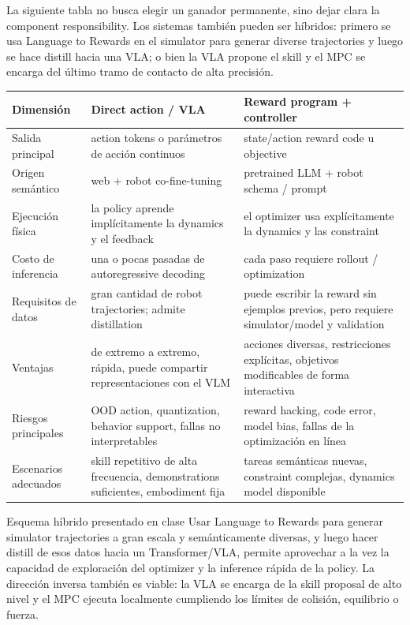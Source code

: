 \documentclass[a4paper]{article}
\begin{document}
La siguiente tabla no busca elegir un ganador permanente, sino dejar clara la component responsibility. Los sistemas también pueden ser híbridos: primero se usa Language to Rewards en el simulator para generar diverse trajectories y luego se hace distill hacia una VLA; o bien la VLA propone el skill y el MPC se encarga del último tramo de contacto de alta precisión.

\begin{longtable}{@{}L{0.20\textwidth}L{0.32\textwidth}L{0.32\textwidth}@{}}
\toprule
Dimensión & Direct action / VLA & Reward program + controller \\
\midrule
Salida principal & action tokens o parámetros de acción continuos & state/action reward code u objective \\
Origen semántico & web + robot co-fine-tuning & pretrained LLM + robot schema / prompt \\
Ejecución física & la policy aprende implícitamente la dynamics y el feedback & el optimizer usa explícitamente la dynamics y las constraint \\
Costo de inferencia & una o pocas pasadas de autoregressive decoding & cada paso requiere rollout / optimization \\
Requisitos de datos & gran cantidad de robot trajectories; admite distillation & puede escribir la reward sin ejemplos previos, pero requiere simulator/model y validation \\
Ventajas & de extremo a extremo, rápida, puede compartir representaciones con el VLM & acciones diversas, restricciones explícitas, objetivos modificables de forma interactiva \\
Riesgos principales & OOD action, quantization, behavior support, fallas no interpretables & reward hacking, code error, model bias, fallas de la optimización en línea \\
Escenarios adecuados & skill repetitivo de alta frecuencia, demonstrations suficientes, embodiment fija & tareas semánticas nuevas, constraint complejas, dynamics model disponible \\
\bottomrule
\end{longtable}

\begin{importantbox}{Esquema híbrido presentado en clase}
Usar Language to Rewards para generar simulator trajectories a gran escala y semánticamente diversas, y luego hacer distill de esos datos hacia un Transformer/VLA, permite aprovechar a la vez la capacidad de exploración del optimizer y la inference rápida de la policy. La dirección inversa también es viable: la VLA se encarga de la skill proposal de alto nivel y el MPC ejecuta localmente cumpliendo los límites de colisión, equilibrio o fuerza.
\end{importantbox}
\end{document}

